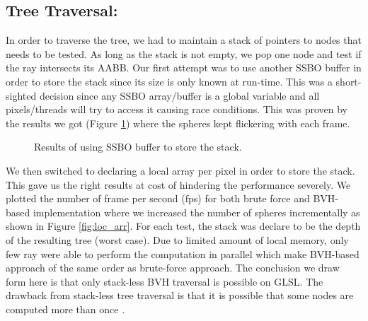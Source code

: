 \documentclass[a4paper,10pt]{article}
\begin{document}
\subsection{Tree Traversal:}
In order to traverse the tree, we had to maintain a stack of pointers to nodes that needs to be tested. As long as the stack is not empty, we pop one node and test if the ray intersects its AABB. Our first attempt was to use another SSBO buffer in order to store the stack since its size is only known at run-time. This was a short-sighted decision since any SSBO array/buffer is a global variable and all pixels/threads will try to access it causing race conditions. This was proven by the results we got (Figure \ref{fig:stack}) where the spheres kept flickering with each frame.

\begin{figure}[tbh]
 \centering     
     
     \caption{Results of using SSBO buffer to store the stack.}
   \label{fig:stack}
\end{figure}

We then switched to declaring a local array per pixel in order to store the stack. This gave us the right results at cost of hindering the performance severely. We plotted the number of frame per second (fps) for both brute force and BVH-based implementation where we increased the number of spheres incrementally as shown in Figure \ref{fig:loc_arr}. For each test, the stack was declare to be the depth of the resulting tree (worst case). Due to limited amount of local memory, only few ray were able to perform the computation in parallel which make BVH-based approach of the same order as brute-force approach. The conclusion we draw form here is that only stack-less BVH traversal is possible on GLSL. The drawback from stack-less tree traversal is that it is possible that some nodes are computed more than once \cite{hapala2011efficient}. 
\end{document}
